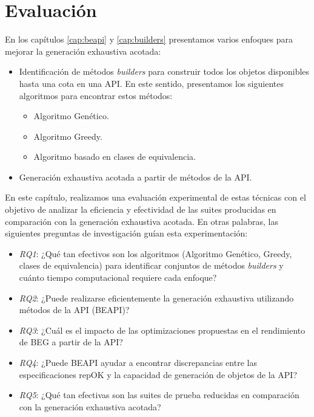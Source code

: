 \chapter[Evaluaci\'on]{Evaluaci\'on}
\label{cap:evaluation}

En los capítulos \ref{cap:beapi} y \ref{cap:builders} presentamos varios enfoques para mejorar la generación exhaustiva acotada:

\begin{itemize}
\item Identificación de métodos \emph{builders} para construir todos los objetos disponibles hasta una cota en una API. En este sentido, presentamos los siguientes algoritmos para encontrar estos métodos:
\begin{itemize}
\item Algoritmo Genético.
\item Algoritmo Greedy.
\item Algoritmo basado en clases de equivalencia.
\end{itemize}
\item Generación exhaustiva acotada a partir de métodos de la API.
\end{itemize}

En este capítulo, realizamos una evaluación experimental de estas técnicas con el objetivo de analizar la eficiencia y efectividad de las suites producidas en comparación con la generación exhaustiva acotada. En otras palabras, las siguientes preguntas de investigación guían esta experimentación:

\begin{itemize}
\item \emph{RQ1}: ¿Qué tan efectivos son los algoritmos (Algoritmo Genético, Greedy, clases de equivalencia) para identificar conjuntos de métodos \emph{builders} y cuánto tiempo computacional requiere cada enfoque?
\item \emph{RQ2}: ¿Puede realizarse eficientemente la generación exhaustiva utilizando métodos de la API (BEAPI)?
\item\emph{RQ3}: ¿Cuál es el impacto de las optimizaciones propuestas en el rendimiento de BEG a partir de la API?
\item\emph{RQ4}: ¿Puede BEAPI ayudar a encontrar discrepancias entre las especificaciones repOK y la capacidad de generación de objetos de la API?
\item\emph{RQ5}: ¿Qué tan efectivas son las suites de prueba reducidas en comparación con la generación exhaustiva acotada?
\end{itemize}

